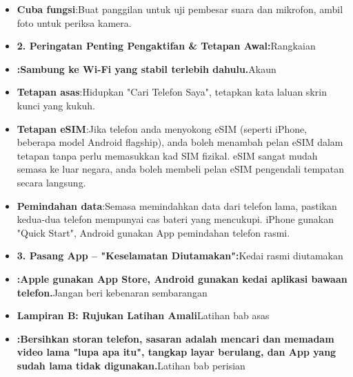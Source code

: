 

\begin{itemize}
  \item \textbf{Cuba fungsi}:Buat panggilan untuk uji pembesar suara dan mikrofon, ambil foto untuk periksa kamera.
  \item \textbf{2. Peringatan Penting Pengaktifan \& Tetapan Awal:}Rangkaian
  \item \textbf{:Sambung ke Wi-Fi yang stabil terlebih dahulu.}Akaun
\end{itemize}


\begin{itemize}
  \item \textbf{Tetapan asas}:Hidupkan "Cari Telefon Saya", tetapkan kata laluan skrin kunci yang kukuh.
  \item \textbf{Tetapan eSIM}:Jika telefon anda menyokong eSIM (seperti iPhone, beberapa model Android flagship), anda boleh menambah pelan eSIM dalam tetapan tanpa perlu memasukkan kad SIM fizikal. eSIM sangat mudah semasa ke luar negara, anda boleh membeli pelan eSIM pengendali tempatan secara langsung.
  \item \textbf{Pemindahan data}:Semasa memindahkan data dari telefon lama, pastikan kedua-dua telefon mempunyai cas bateri yang mencukupi. iPhone gunakan "Quick Start", Android gunakan App pemindahan telefon rasmi.
  \item \textbf{3. Pasang App – "Keselamatan Diutamakan":}Kedai rasmi diutamakan
  \item \textbf{:Apple gunakan App Store, Android gunakan kedai aplikasi bawaan telefon.}Jangan beri kebenaran sembarangan
\end{itemize}


\begin{itemize}
  \item \textbf{Lampiran B: Rujukan Latihan Amali}Latihan bab asas
  \item \textbf{:Bersihkan storan telefon, sasaran adalah mencari dan memadam video lama "lupa apa itu", tangkap layar berulang, dan App yang sudah lama tidak digunakan.}Latihan bab perisian
\end{itemize}

